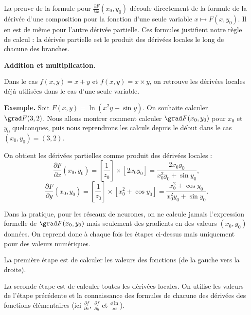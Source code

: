 \documentclass[11pt,class=report,crop=false]{standalone}
\begin{document}
La preuve de la formule pour $\frac{\partial F}{\partial x}(x_0,y_0)$ découle directement de la formule de la dérivée d'une composition pour la fonction d'une seule variable $x \mapsto F(x,y_0)$. Il en est de même pour l'autre dérivée partielle.
Ces formules justifient notre règle de calcul : la dérivée partielle est le produit des dérivées locales le long de chacune des branches.



\bigskip
\textbf{Addition et multiplication.}

Dans le cas $f(x,y) = x + y$ et $f(x,y)= x \times y$, on retrouve les dérivées locales déjà utilisées dans le cas d'une seule variable.




\bigskip
\textbf{Exemple.}
Soit $F(x,y) = \ln(x^2y+\sin y)$. On souhaite calculer $\grad F(3,2)$.
Nous allons montrer comment calculer $\grad F(x_0,y_0)$ pour $x_0$ et $y_0$ quelconques, puis nous reprendrons les calculs depuis le début dans le cas $(x_0,y_0)=(3,2)$.


On obtient les dérivées partielles comme produit des dérivées locales :
$$\frac{\partial F}{\partial x} (x_0,y_0) = \left[ \frac{1}{z_0} \right] \times [2x_0y_0] = \frac{2x_0y_0}{x_0^2y_0+\sin y_0},$$
$$\frac{\partial F}{\partial y} (x_0,y_0) = \left[ \frac{1}{z_0} \right] \times [x_0^2 + \cos y_0] = \frac{x_0^2 + \cos y_0}{x_0^2y_0+\sin y_0}.$$



Dans la pratique, pour les réseaux de neurones, on ne calcule jamais l'expression formelle de $\grad F(x_0,y_0)$ mais seulement des gradients en des valeurs $(x_0,y_0)$ données. On reprend donc à chaque fois les étapes ci-dessus mais uniquement pour des valeurs numériques.



La première étape est de calculer les valeurs des fonctions (de la gauche vers la droite).

La seconde étape est de calculer toutes les dérivées locales. On utilise les valeurs de l'étape précédente et la connaissance des formules de chacune des dérivées des fonctions élémentaires (ici $\frac{\partial f}{\partial x}$, $\frac{\partial f}{\partial y}$ et $\frac{\dd \ln}{\dd z}$).
\end{document}
